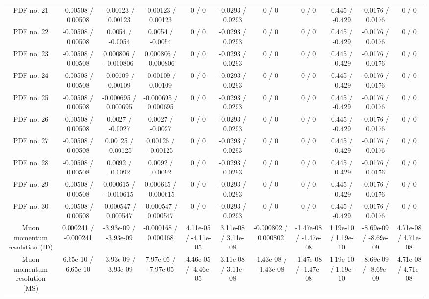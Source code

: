 \begin{table}[htbp]
\begin{center}
\begin{tabular}{|c|c|c|c|c|c|c|c|c|c|c|}
  PDF no. 21 & -0.00508 / 0.00508 & -0.00123 / 0.00123 & -0.00123 / 0.00123 & 0 / 0 & -0.0293 / 0.0293 & 0 / 0 & 0 / 0 & 0.445 / -0.429 & -0.0176 / 0.0176 & 0 / 0 \\ 
  PDF no. 22 & -0.00508 / 0.00508 & 0.0054 / -0.0054 & 0.0054 / -0.0054 & 0 / 0 & -0.0293 / 0.0293 & 0 / 0 & 0 / 0 & 0.445 / -0.429 & -0.0176 / 0.0176 & 0 / 0 \\ 
  PDF no. 23 & -0.00508 / 0.00508 & 0.000806 / -0.000806 & 0.000806 / -0.000806 & 0 / 0 & -0.0293 / 0.0293 & 0 / 0 & 0 / 0 & 0.445 / -0.429 & -0.0176 / 0.0176 & 0 / 0 \\ 
  PDF no. 24 & -0.00508 / 0.00508 & -0.00109 / 0.00109 & -0.00109 / 0.00109 & 0 / 0 & -0.0293 / 0.0293 & 0 / 0 & 0 / 0 & 0.445 / -0.429 & -0.0176 / 0.0176 & 0 / 0 \\ 
  PDF no. 25 & -0.00508 / 0.00508 & -0.000695 / 0.000695 & -0.000695 / 0.000695 & 0 / 0 & -0.0293 / 0.0293 & 0 / 0 & 0 / 0 & 0.445 / -0.429 & -0.0176 / 0.0176 & 0 / 0 \\ 
  PDF no. 26 & -0.00508 / 0.00508 & 0.0027 / -0.0027 & 0.0027 / -0.0027 & 0 / 0 & -0.0293 / 0.0293 & 0 / 0 & 0 / 0 & 0.445 / -0.429 & -0.0176 / 0.0176 & 0 / 0 \\ 
  PDF no. 27 & -0.00508 / 0.00508 & 0.00125 / -0.00125 & 0.00125 / -0.00125 & 0 / 0 & -0.0293 / 0.0293 & 0 / 0 & 0 / 0 & 0.445 / -0.429 & -0.0176 / 0.0176 & 0 / 0 \\ 
  PDF no. 28 & -0.00508 / 0.00508 & 0.0092 / -0.0092 & 0.0092 / -0.0092 & 0 / 0 & -0.0293 / 0.0293 & 0 / 0 & 0 / 0 & 0.445 / -0.429 & -0.0176 / 0.0176 & 0 / 0 \\ 
  PDF no. 29 & -0.00508 / 0.00508 & 0.000615 / -0.000615 & 0.000615 / -0.000615 & 0 / 0 & -0.0293 / 0.0293 & 0 / 0 & 0 / 0 & 0.445 / -0.429 & -0.0176 / 0.0176 & 0 / 0 \\ 
  PDF no. 30 & -0.00508 / 0.00508 & -0.000547 / 0.000547 & -0.000547 / 0.000547 & 0 / 0 & -0.0293 / 0.0293 & 0 / 0 & 0 / 0 & 0.445 / -0.429 & -0.0176 / 0.0176 & 0 / 0 \\ 
  Muon momentum resolution (ID) & 0.000241 / -0.000241 & -3.93e-09 / -3.93e-09 & -0.000168 / 0.000168 & 4.11e-05 / -4.11e-05 & 3.11e-08 / 3.11e-08 & -0.000802 / 0.000802 & -1.47e-08 / -1.47e-08 & 1.19e-10 / 1.19e-10 & -8.69e-09 / -8.69e-09 & 4.71e-08 / 4.71e-08 \\ 
  Muon momentum resolution (MS) & 6.65e-10 / 6.65e-10 & -3.93e-09 / -3.93e-09 & 7.97e-05 / -7.97e-05 & 4.46e-05 / -4.46e-05 & 3.11e-08 / 3.11e-08 & -1.43e-08 / -1.43e-08 & -1.47e-08 / -1.47e-08 & 1.19e-10 / 1.19e-10 & -8.69e-09 / -8.69e-09 & 4.71e-08 / 4.71e-08 \\ 

\end{tabular}
\end{center}
\end{table}
